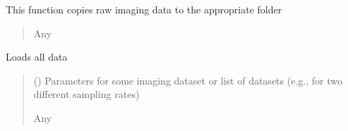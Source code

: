 \documentclass[letterpaper,10pt,english]{sphinxmanual}
\begin{document}
\begin{fulllineitems}
\begin{fulllineitems}
\begin{quote}
\begin{description}
\end{description}\end{quote}

\end{fulllineitems}


\begin{fulllineitems}
\label{\detokenize{Organization:Organization.ImagingExperiment.copy_raw_imaging_data}}
\pysigstartsignatures
{}
\pysigstopsignatures
\sphinxAtStartPar
This function copies raw imaging data to the appropriate folder
\begin{quote}\begin{description}
\sphinxAtStartPar
Any

\end{description}\end{quote}

\end{fulllineitems}


\begin{fulllineitems}
\label{\detokenize{Organization:Organization.ImagingExperiment.load_data}}
\pysigstartsignatures
{}
\pysigstopsignatures
\sphinxAtStartPar
Loads all data
\begin{quote}\begin{description}
\sphinxAtStartPar
{} (\sphinxstyleliteralemphasis{\sphinxupquote{{[}}}\sphinxstyleliteralemphasis{\sphinxupquote{{]}}}) \textendash{} Parameters for some imaging dataset or list of datasets (e.g., for two different sampling rates)

\sphinxAtStartPar
Any

\end{description}\end{quote}

\end{fulllineitems}


\end{fulllineitems}
\end{document}
